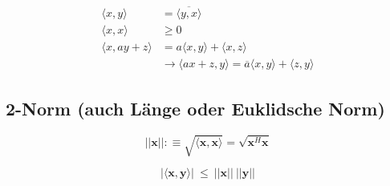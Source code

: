 		\begin{fcharac}[Eigenschaften SP]
			\begin{align*}
				\langle x,y \rangle &= \overline{\langle y,x \rangle} \\
				\langle x,x \rangle &\ge 0 \\
				\langle x,ay+z \rangle &= a\langle x,y \rangle+ \langle x,z \rangle \\
				&\rightarrow \langle ax+z,y \rangle = \overline{a} \langle x,y 
					\rangle +\langle z,y \rangle
			\end{align*}
		\end{fcharac}
		
	\subsection{2-Norm (auch Länge oder Euklidsche Norm)}
	
		\begin{fdef}
			\[
				||\mathbf{x}|| :\equiv \sqrt{\langle \mathbf{x},\mathbf{x} \rangle} 
					= \sqrt{\mathbf{x}^H \mathbf{x}}
			\]
		\end{fdef}
		
		\begin{ftheo}
			\[
				|\langle \mathbf{x},\mathbf{y} \rangle| \ \leq \ ||\mathbf{x}|| \ ||\mathbf{y}||
			\]
		\end{ftheo}


	
	
	
